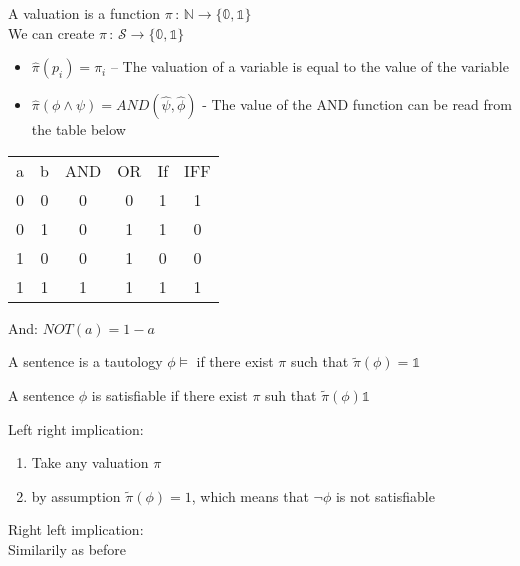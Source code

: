 {A valuation is a function $\pi\,:\,\mathbb{N} \longrightarrow \{\mathbb{0},\mathbb{1}\} $ \\
        We can create $\hat{\pi}\,:\,\mathcal{S} \longrightarrow \{\mathbb{0},\mathbb{1}\}$
        {
                \begin{itemize}
                        \item $\hat{\pi}(p_i) = \pi_i$ -- The valuation of a variable is equal to the value of the variable
                        \item $\hat{\pi}(\phi \wedge   \psi) = AND(\hat{\psi},\hat{\phi})$ - The value of the AND function can be read from the table below
                \end{itemize}

                \begin{center}
                \begin{tabular}{|c|c|c|c|c|c|}
                \hline
                        a & b & AND & OR & If & IFF \\
                        0 & 0 & 0 & 0 & 1 & 1 \\
                        0 & 1 & 0 & 1 & 1 & 0 \\
                        1 & 0 & 0 & 1 & 0 & 0 \\
                        1 & 1 & 1 & 1 & 1 & 1 \\
                \hline
                \end{tabular}
                And:
                $NOT(a) = 1-a$

                \end{center}
        }

}
{
        A sentence is a tautology $\phi \vDash $ if there exist $\pi$ such that $\tilde{\pi}(\phi) = \mathbb{1}$ 

}
{A sentence $\phi$ is satisfiable if there exist  $\pi$ suh that  $\tilde{\pi}(\phi)  \mathbb{1}$}
\begin{myproof}

Left right implication:
\begin{enumerate}
        \item Take any valuation $\pi$
        \item by assumption $\tilde{\pi}(\phi) = 1$, which means that  $\neg \phi$ is not satisfiable
\end{enumerate}        
Right left implication:\\
Similarily as before

\end{myproof}

